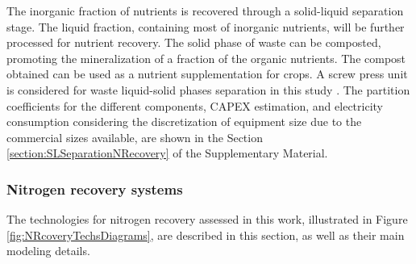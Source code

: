 \begin{refsection}[referencesCh6]
The inorganic fraction of nutrients is recovered through a solid-liquid separation stage. The liquid fraction, containing most of inorganic nutrients, will be further processed for nutrient recovery. The solid phase of waste can be composted, promoting the mineralization of a fraction of the organic nutrients. The compost obtained can be used as a nutrient supplementation for crops. A screw press unit is considered for waste liquid-solid phases separation in this study \citep{MollerSL}. The partition coefficients for the different components, CAPEX estimation, and electricity consumption considering the discretization of equipment size due to the commercial sizes available, are shown in the
Section \ref{section:SLSeparationNRecovery} of the Supplementary Material.

\subsubsection{Nitrogen recovery systems}
The technologies for nitrogen recovery assessed in this work, illustrated in Figure \ref{fig:NRcoveryTechsDiagrams}, are described in this section, as well as their main modeling details.


\end{refsection}
